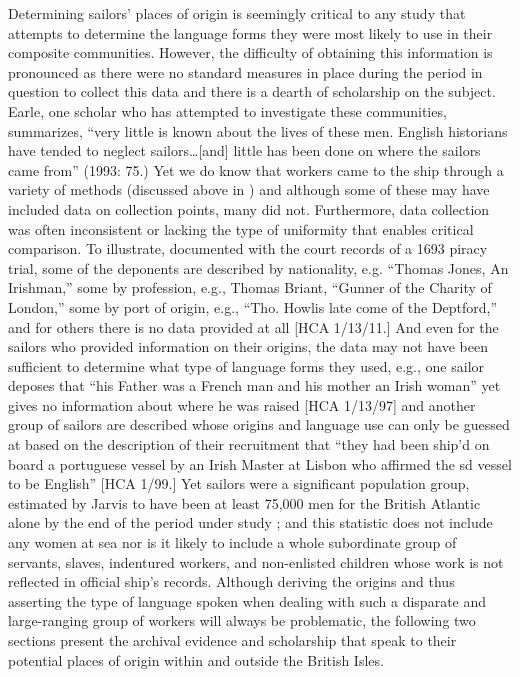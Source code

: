   Determining sailors’ places of origin is seemingly critical to any study that attempts to determine the language forms they were most likely to use in their composite communities. However, the difficulty of obtaining this information is pronounced as there were no standard measures in place during the period in question to collect this data and there is a dearth of scholarship on the subject. Earle, one scholar who has attempted to investigate these communities, summarizes, “very little is known about the lives of these men. English historians have tended to neglect sailors…[and] little has been done on where the sailors came from” (1993: 75.) Yet we do know that workers came to the ship through a variety of methods (discussed above in ) and although some of these may have included data on collection points, many did not. Furthermore, data collection was often inconsistent or lacking the type of uniformity that enables critical comparison. To illustrate, documented with the court records of a 1693 piracy trial, some of the deponents are described by nationality, e.g. “Thomas Jones, An Irishman,” some by profession, e.g., Thomas Briant, “Gunner of the Charity of London,” some by port of origin, e.g., “Tho. Howlis late come of the Deptford,” and for others there is no data provided at all [HCA 1/13/11.] And even for the sailors who provided information on their origins, the data may not have been sufficient to determine what type of language forms they used, e.g., one sailor deposes that “his Father was a French man and his mother an Irish woman” yet gives no information about where he was raised [HCA 1/13/97] and another group of sailors are described whose origins and language use can only be guessed at based on the description of their recruitment that “they had been ship’d on board a portuguese vessel by an Irish Master at Lisbon who affirmed the sd vessel to be English” [HCA 1/99.] Yet sailors were a significant population group, estimated by Jarvis to have been at least 75,000 men for the British Atlantic alone by the end of the period under study \citep[252]{Jarvis2010}; and this statistic does not include any women at sea nor is it likely to include a whole subordinate group of servants, slaves, indentured workers, and non-enlisted children whose work is not reflected in official ship’s records. Although deriving the origins and thus asserting the type of language spoken when dealing with such a disparate and large-ranging group of workers will always be problematic, the following two sections present the archival evidence and scholarship that speak to their potential places of origin within and outside the British Isles.

